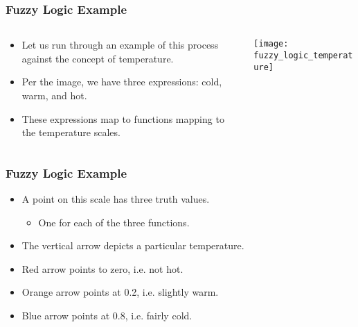 \documentclass{beamer}
\begin{document}
   \begin{frame}
      \frametitle{Fuzzy Logic Example}
      \begin{columns}[T]
         \begin{column}[T]{5cm}
            \begin{itemize}
               \item Let us run through an example of this process against the concept of temperature.
               \item Per the image, we have three expressions: cold, warm, and hot.
               \item These expressions map to functions mapping to the temperature scales.
            \end{itemize}
         \end{column}
         \begin{column}[T]{5cm}
            \texttt{[image: fuzzy\_logic\_temperature]}
         \end{column}
      \end{columns}
   \end{frame}

   \begin{frame}
      \frametitle{Fuzzy Logic Example}
      \begin{itemize}
         \item A point on this scale has three truth values.
         \begin{itemize}
            \item One for each of the three functions.
         \end{itemize}
         \item The vertical arrow depicts a particular temperature.
         \item Red arrow points to zero, i.e. not hot.
         \item Orange arrow points at 0.2, i.e. slightly warm.
         \item Blue arrow points at 0.8, i.e. fairly cold.
      \end{itemize} 
   \end{frame}
\end{document}
